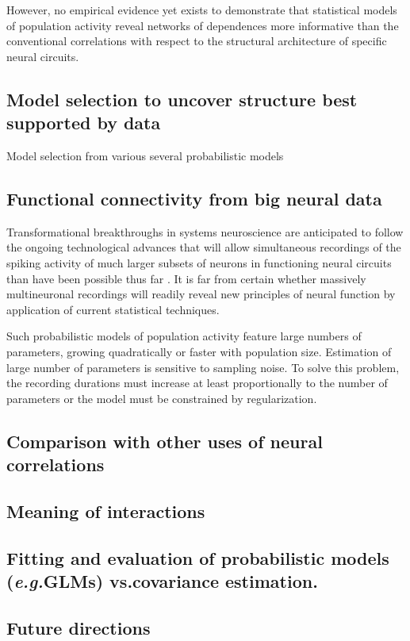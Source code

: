 \documentclass[10pt]{article}
\begin{document}
However, no empirical evidence yet exists to demonstrate that statistical models of population activity reveal networks of dependences more informative than the conventional correlations with respect to the structural architecture of specific neural circuits.


\subsection*{Model selection to uncover structure best supported by data}
Model selection from various several probabilistic models  

\subsection*{Functional connectivity from big neural data}
Transformational breakthroughs in systems neuroscience are anticipated to follow the ongoing technological advances that will allow simultaneous recordings of the spiking activity of much larger subsets of neurons in functioning neural circuits than have been possible thus far \cite{Alivisatos:2013}. It is far from certain whether massively multineuronal recordings will readily reveal new principles of neural function by application of current statistical techniques. 

Such probabilistic models of population activity feature large numbers of parameters, growing quadratically or faster with population size. Estimation of large number of parameters is sensitive to sampling noise. To solve this problem, the recording durations must increase at least proportionally to the number of parameters or the model must be constrained by regularization. 

\subsection*{Comparison with other uses of neural correlations}
\subsection*{Meaning of interactions}
\subsection*{Fitting and evaluation of probabilistic models (\emph{e.g.}\;GLMs) vs.\;covariance estimation.}
\subsection*{Future directions}
\end{document}
